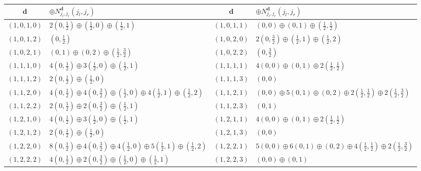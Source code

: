 \begin{table}
	\centering
	\begin{tabular}{|c|C{26ex}||c|C{26ex}|} \hline
		$ \mathbf{d} $ & $ \oplus N_{j_l, j_r}^{\mathbf{d}} (j_l, j_r) $ & $ \mathbf{d}$ & $\oplus N_{j_l, j_r}^{\mathbf{d}} (j_l, j_r) $ \\ \hline
		$ (1, 0, 1, 0) $ & $ 2(0,\frac{1}{2}) \oplus (\frac{1}{2},0) \oplus (\frac{1}{2},1) $ & $ (1, 0, 1, 1) $ & $ (0,0) \oplus (0,1) \oplus (\frac{1}{2},\frac{1}{2}) $ \\ \hline
		$ (1, 0, 1, 2) $ & $ (0, \frac{1}{2}) $ & $ (1, 0, 2, 0) $ & $ 2(0,\frac{3}{2}) \oplus (\frac{1}{2},1) \oplus (\frac{1}{2},2) $ \\ \hline
		$ (1, 0, 2, 1) $ & $ (0,1) \oplus (0,2) \oplus (\frac{1}{2},\frac{3}{2}) $ & $ (1, 0, 2, 2) $ & $ (0, \frac{3}{2}) $ \\ \hline
		$ (1, 1, 1, 0) $ & $ 4(0,\frac{1}{2}) \oplus 3(\frac{1}{2},0) \oplus (\frac{1}{2},1) $ & $ (1, 1, 1, 1) $ & $ 4(0,0) \oplus (0,1) \oplus 2(\frac{1}{2},\frac{1}{2}) $ \\ \hline
		$ (1, 1, 1, 2) $ & $ 2(0,\frac{1}{2}) \oplus (\frac{1}{2},0) $ & $ (1, 1, 1, 3) $ & $ (0, 0) $  \\ \hline
		$ (1, 1, 2, 0) $ & $ 4(0,\frac{1}{2}) \oplus 4(0,\frac{3}{2}) \oplus (\frac{1}{2},0) \oplus 4(\frac{1}{2},1) \oplus (\frac{1}{2},2) $ & $ (1, 1, 2, 1) $ & $ (0,0) \oplus 5(0,1) \oplus (0,2) \oplus 2(\frac{1}{2},\frac{1}{2}) \oplus 2(\frac{1}{2},\frac{3}{2}) $ \\ \hline
		$ (1, 1, 2, 2) $ & $ 2(0,\frac{1}{2}) \oplus 2(0,\frac{3}{2}) \oplus (\frac{1}{2},1) $ & $ (1, 1, 2, 3) $ & $ (0, 1) $ \\ \hline
		$ (1, 2, 1, 0) $ & $ 4(0,\frac{1}{2}) \oplus 3(\frac{1}{2},0) \oplus (\frac{1}{2},1) $ & $ (1, 2, 1, 1) $ & $ 4(0,0) \oplus (0,1) \oplus 2(\frac{1}{2},\frac{1}{2}) $ \\ \hline
		$ (1, 2, 1, 2) $ & $ 2(0,\frac{1}{2}) \oplus (\frac{1}{2},0) $ & $ (1, 2, 1, 3) $ & $ (0, 0) $  \\ \hline
		$ (1, 2, 2, 0) $ & $ 8(0,\frac{1}{2}) \oplus 4(0,\frac{3}{2}) \oplus 4(\frac{1}{2},0) \oplus 5(\frac{1}{2},1) \oplus (\frac{1}{2},2) $ & $ (1, 2, 2, 1) $ & $ 5(0,0) \oplus 6(0,1) \oplus (0,2) \oplus 4(\frac{1}{2},\frac{1}{2}) \oplus 2(\frac{1}{2},\frac{3}{2}) $ \\ \hline
		$ (1, 2, 2, 2) $ & $ 4(0,\frac{1}{2}) \oplus 2(0,\frac{3}{2}) \oplus (\frac{1}{2},0) \oplus (\frac{1}{2},1) $ & $ (1, 2, 2, 3) $ & $ (0,0) \oplus (0,1) $ \\ \hline

\end{tabular}
\end{table}
